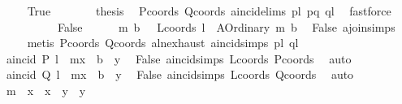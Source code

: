 \begin{isabellebody}
\ \ \ \ \isamarkupfalse%
\ True\isanewline
\ \ \ \ \isamarkupfalse%
\ \isamarkupfalse%
\ {\isacharquery}{\kern0pt}thesis\ \isamarkupfalse%
\ Pcoords\ Qcoords\ a{}incid{\isachardot}{\kern0pt}elims{\isacharparenleft}{\kern0pt}{}{\isacharparenright}{\kern0pt}\ pl\ pq\ ql\ \isamarkupfalse%
\ fastforce\isanewline
\ \ \isamarkupfalse%
\ \ \isanewline
\ \ \ \ \isamarkupfalse%
\ False\isanewline
\ \ \ \ \isamarkupfalse%
\ m\ b\ \ \ Lcoords{\isacharcolon}{\kern0pt}\ {\isachardoublequoteopen}l\ {\isacharequal}{\kern0pt}\ {\isacharparenleft}{\kern0pt}A{}Ordinary\ m\ b{\isacharparenright}{\kern0pt}{\isachardoublequoteclose}\ \isamarkupfalse%
\ False\ a{}join{\isachardot}{\kern0pt}simps\isanewline
\ \ \ \ \isamarkupfalse%
\ {\isacharparenleft}{\kern0pt}metis\ Pcoords\ Qcoords\ a{}ln{\isachardot}{\kern0pt}exhaust\ a{}incid{\isachardot}{\kern0pt}simps{\isacharparenleft}{\kern0pt}{}{\isacharparenright}{\kern0pt}\ pl\ ql{\isacharparenright}{\kern0pt}\isanewline
\isanewline
\ \ \ \ \isamarkupfalse%
\ {}{\isacharcolon}{\kern0pt}\ {\isachardoublequoteopen}{\isacharparenleft}{\kern0pt}a{}incid\ P\ l{\isacharparenright}{\kern0pt}\ {\isacharequal}{\kern0pt}\ {\isacharparenleft}{\kern0pt}m{\isacharasterisk}{\kern0pt}x{}\ {\isacharplus}{\kern0pt}\ b\ {\isacharequal}{\kern0pt}\ y{}{\isacharparenright}{\kern0pt}{\isachardoublequoteclose}\ \isamarkupfalse%
\ False\ a{}incid{\isachardot}{\kern0pt}simps\ Lcoords\ Pcoords\ \isamarkupfalse%
\ auto\isanewline
\ \ \ \ \isamarkupfalse%
\ {}{\isacharcolon}{\kern0pt}\ {\isachardoublequoteopen}{\isacharparenleft}{\kern0pt}a{}incid\ Q\ l{\isacharparenright}{\kern0pt}\ {\isacharequal}{\kern0pt}\ {\isacharparenleft}{\kern0pt}m{\isacharasterisk}{\kern0pt}x{}\ {\isacharplus}{\kern0pt}\ b\ {\isacharequal}{\kern0pt}\ y{}{\isacharparenright}{\kern0pt}{\isachardoublequoteclose}\ \isamarkupfalse%
\ False\ a{}incid{\isachardot}{\kern0pt}simps\ Lcoords\ Qcoords\ \isamarkupfalse%
\ auto\isanewline
\ \ \ \ \isamarkupfalse%
\ {}{\isacharcolon}{\kern0pt}\ {\isachardoublequoteopen}m\ {\isacharasterisk}{\kern0pt}\ {\isacharparenleft}{\kern0pt}x{}\ {\isacharminus}{\kern0pt}\ x{}{\isacharparenright}{\kern0pt}\ {\isacharequal}{\kern0pt}\ y{}\ {\isacharminus}{\kern0pt}\ y{}{\isachardoublequoteclose}\ \isamarkupfalse%

\end{isabellebody}
